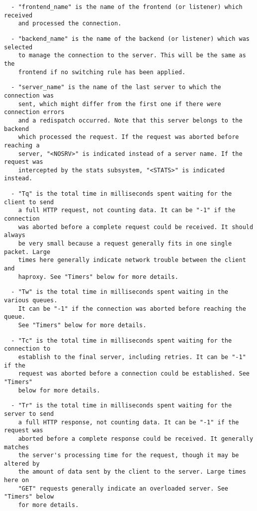 \begin{verbatim}
  - "frontend_name" is the name of the frontend (or listener) which received
    and processed the connection.
\end{verbatim}

\begin{verbatim}
  - "backend_name" is the name of the backend (or listener) which was selected
    to manage the connection to the server. This will be the same as the
    frontend if no switching rule has been applied.
\end{verbatim}

\begin{verbatim}
  - "server_name" is the name of the last server to which the connection was
    sent, which might differ from the first one if there were connection errors
    and a redispatch occurred. Note that this server belongs to the backend
    which processed the request. If the request was aborted before reaching a
    server, "<NOSRV>" is indicated instead of a server name. If the request was
    intercepted by the stats subsystem, "<STATS>" is indicated instead.
\end{verbatim}

\begin{verbatim}
  - "Tq" is the total time in milliseconds spent waiting for the client to send
    a full HTTP request, not counting data. It can be "-1" if the connection
    was aborted before a complete request could be received. It should always
    be very small because a request generally fits in one single packet. Large
    times here generally indicate network trouble between the client and
    haproxy. See "Timers" below for more details.
\end{verbatim}

\begin{verbatim}
  - "Tw" is the total time in milliseconds spent waiting in the various queues.
    It can be "-1" if the connection was aborted before reaching the queue.
    See "Timers" below for more details.
\end{verbatim}

\begin{verbatim}
  - "Tc" is the total time in milliseconds spent waiting for the connection to
    establish to the final server, including retries. It can be "-1" if the
    request was aborted before a connection could be established. See "Timers"
    below for more details.
\end{verbatim}

\begin{verbatim}
  - "Tr" is the total time in milliseconds spent waiting for the server to send
    a full HTTP response, not counting data. It can be "-1" if the request was
    aborted before a complete response could be received. It generally matches
    the server's processing time for the request, though it may be altered by
    the amount of data sent by the client to the server. Large times here on
    "GET" requests generally indicate an overloaded server. See "Timers" below
    for more details.
\end{verbatim}

